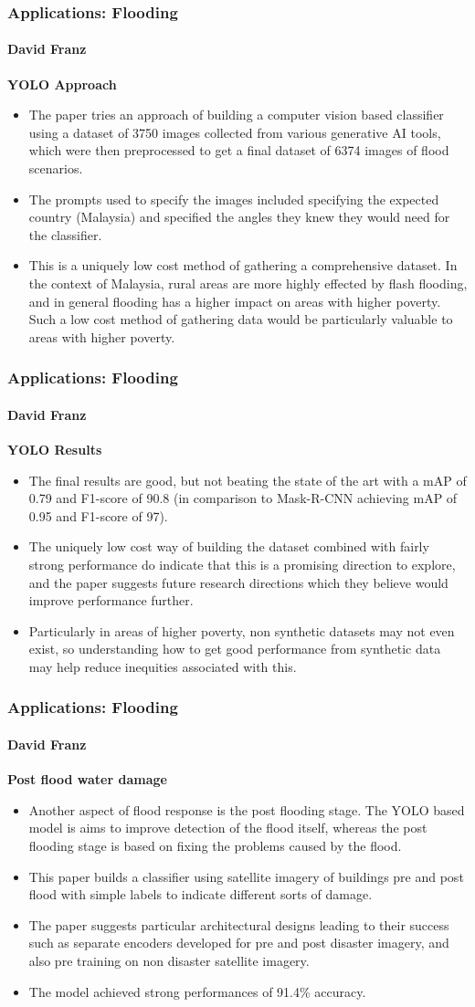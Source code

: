 \documentclass{beamer}
\newcommand{\namedframe}[3]{
  \begin{frame}
    \frametitle{#2}
    \framesubtitle{#1}
    #3
  \end{frame}
}
\begin{document}
\namedframe{David Franz}{Applications: Flooding}{
  \textbf{YOLO Approach}
    \begin{itemize}
        \item The paper tries an approach of building a computer vision based classifier using a dataset of 3750 images collected from various generative AI tools, which were then preprocessed to get a final dataset of 6374 images of flood scenarios. 
        \item The prompts used to specify the images included specifying the expected country (Malaysia) and specified the angles they knew they would need for the classifier. 
        \item This is a uniquely low cost method of gathering a comprehensive dataset. In the context of Malaysia, rural areas are more highly effected by flash flooding, and in general flooding has a higher impact on areas with higher poverty. Such a low cost method of gathering data would be particularly valuable to areas with higher poverty.
    \end{itemize}
}

\namedframe{David Franz}{Applications: Flooding}{
\textbf{YOLO Results}
    \begin{itemize}
        \item The final results are good, but not beating the state of the art with a mAP of 0.79 and F1-score of 90.8 (in comparison to Mask-R-CNN achieving mAP of 0.95 and F1-score of 97). 
        \item The uniquely low cost way of building the dataset combined with fairly strong performance do indicate that this is a promising direction to explore, and the paper suggests future research directions which they believe would improve performance further. 
        \item Particularly in areas of higher poverty, non synthetic datasets may not even exist, so understanding how to get good performance from synthetic data may help reduce inequities associated with this.
    \end{itemize}
}


\namedframe{David Franz}{Applications: Flooding}{
\textbf{Post flood water damage}
    \begin{itemize}
        \item Another aspect of flood response is the post flooding stage. The YOLO based model is aims to improve detection of the flood itself, whereas the post flooding stage is based on fixing the problems caused by the flood.
        \item This paper builds a classifier using satellite imagery of buildings pre and post flood with simple labels to indicate different sorts of damage.  
        \item         The paper suggests particular architectural designs leading to their success such as separate encoders developed for pre and post disaster imagery, and also pre training on non disaster satellite imagery. 
        \item The model achieved strong performances of 91.4\% accuracy. 
    \end{itemize}
}
\end{document}
